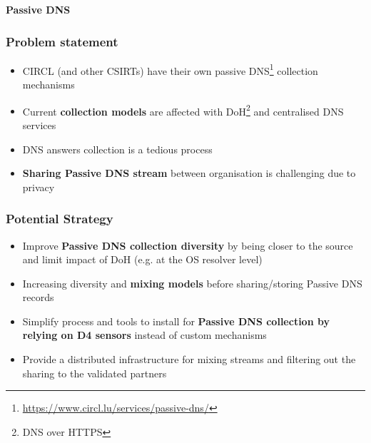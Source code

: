 \documentclass{beamer}
\begin{document}
\begin{frame}
  \begin{center}
    {\bf Passive DNS}
  \end{center}
\end{frame}

\begin{frame}
        \frametitle{Problem statement}
        \begin{itemize}
                \item CIRCL (and other CSIRTs) have their own passive DNS\footnote{\url{https://www.circl.lu/services/passive-dns/}} collection mechanisms
                \item Current {\bf collection models} are affected with DoH\footnote{DNS over HTTPS} and centralised DNS services
                \item DNS answers collection is a tedious process
                \item {\bf Sharing Passive DNS stream} between organisation is challenging due to privacy
        \end{itemize}
\end{frame}

\begin{frame}
        \frametitle{Potential Strategy}
 \begin{itemize}
         \item Improve {\bf Passive DNS collection diversity} by being closer to the source and limit impact of DoH (e.g. at the OS resolver level)
         \item Increasing diversity and {\bf mixing models} before sharing/storing Passive DNS records
         \item Simplify process and tools to install for {\bf Passive DNS collection by relying on D4 sensors} instead of custom mechanisms
         \item Provide a distributed infrastructure for mixing streams and filtering out the sharing to the validated partners
 \end{itemize}
\end{frame}
\end{document}
